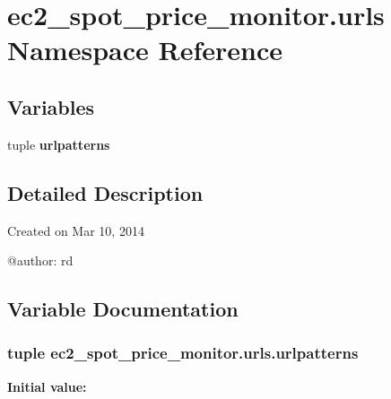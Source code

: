 \hypertarget{namespaceec2__spot__price__monitor_1_1urls}{\section{ec2\-\_\-spot\-\_\-price\-\_\-monitor.\-urls Namespace Reference}
\label{namespaceec2__spot__price__monitor_1_1urls}
}
\subsection*{Variables}
\begin{DoxyCompactItemize}
\item 
tuple {\bfseries urlpatterns}
\end{DoxyCompactItemize}


\subsection{Detailed Description}
\begin{DoxyVerb}Created on Mar 10, 2014

@author: rd
\end{DoxyVerb}
 

\subsection{Variable Documentation}
\hypertarget{namespaceec2__spot__price__monitor_1_1urls_ace2ade627bae542176d3e9d90978faea}{
\subsubsection[{urlpatterns}]{\setlength{\rightskip}{0pt plus 5cm}tuple ec2\-\_\-spot\-\_\-price\-\_\-monitor.\-urls.\-urlpatterns}}\label{namespaceec2__spot__price__monitor_1_1urls_ace2ade627bae542176d3e9d90978faea}
{\bfseries Initial value\-:}
